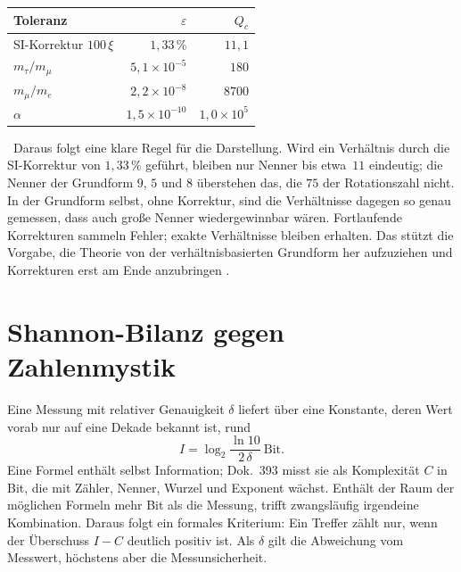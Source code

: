 \begin{center}
\begin{tabular}{@{}lrr@{}}
\toprule
\textbf{Toleranz} & \textbf{$\varepsilon$} & \textbf{$Q_c$}\\
\midrule
SI-Korrektur $100\,\xi$ & $1{,}33\,\%$ & $11{,}1$\\
$m_\tau/m_\mu$ & $5{,}1\times10^{-5}$ & $180$\\
$m_\mu/m_e$ & $2{,}2\times10^{-8}$ & $8700$\\
$\alpha$ & $1{,}5\times10^{-10}$ & $1{,}0\times10^{5}$\\
\bottomrule
\end{tabular}
\end{center}
\KM\ Daraus folgt eine klare Regel für die Darstellung. Wird ein Verhältnis durch die SI-Korrektur
von $1{,}33\,\%$ geführt, bleiben nur Nenner bis etwa~$11$ eindeutig; die Nenner der Grundform $9$,
$5$ und $8$ überstehen das, die $75$ der Rotationszahl nicht. In der Grundform selbst, ohne Korrektur,
sind die Verhältnisse dagegen so genau gemessen, dass auch große Nenner wiedergewinnbar wären.
Fortlaufende Korrekturen sammeln Fehler; exakte Verhältnisse bleiben erhalten. Das stützt die Vorgabe,
die Theorie von der verhältnisbasierten Grundform her aufzuziehen und Korrekturen erst am Ende
anzubringen \SM.

\section{Shannon-Bilanz gegen Zahlenmystik}

Eine Messung mit relativer Genauigkeit $\delta$ liefert über eine Konstante, deren Wert vorab nur
auf eine Dekade bekannt ist, rund
\begin{equation}
  I=\log_2\frac{\ln 10}{2\,\delta}\ \text{Bit}.
\end{equation}
Eine Formel enthält selbst Information; Dok.~393 misst sie als Komplexität $C$ in Bit, die mit Zähler,
Nenner, Wurzel und Exponent wächst. Enthält der Raum der möglichen Formeln mehr Bit als die Messung,
trifft zwangsläufig irgendeine Kombination. Daraus folgt ein formales Kriterium: Ein Treffer zählt nur,
wenn der Überschuss $I-C$ deutlich positiv ist. Als $\delta$ gilt die Abweichung vom Messwert, höchstens
aber die Messunsicherheit.

